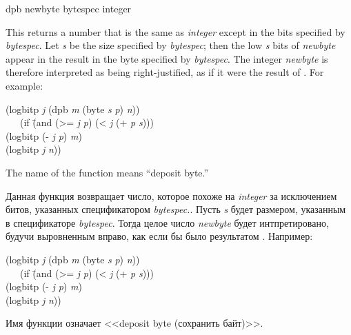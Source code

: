 \begin{defun}[Function]
dpb newbyte bytespec integer

This returns a number that is the same as \emph{integer} except in the
bits specified by \emph{bytespec}.  Let \emph{s} be the size specified
by \emph{bytespec}; then the low \emph{s} bits of \emph{newbyte} appear in
the result in the byte specified by \emph{bytespec}.
The integer \emph{newbyte} is therefore interpreted as
being right-justified, as if it were the result of .
For example:
\begin{lisp}
(logbitp \emph{j} (dpb \emph{m} (byte \emph{s} \emph{p}) \emph{n})) \\
~~\EQ\ (if \=(and (>= \emph{j} \emph{p}) (< \emph{j} (+ \emph{p} \emph{s}))) \\
\>(logbitp (- \emph{j} \emph{p}) \emph{m}) \\
\>(logbitp \emph{j} \emph{n}))
\end{lisp}
The name of the function  means ``deposit byte.''

Данная функция возвращает число, которое похоже на \emph{integer} за исключением
 битов, указанных спецификатором \emph{bytespec.}. Пусть \emph{s} будет
 размером, указанным в спецификаторе \emph{bytespec}.
Тогда целое число \emph{newbyte} будет интпретировано, будучи выровненным вправо,
как если бы было результатом .
Например:
\begin{lisp}
(logbitp \emph{j} (dpb \emph{m} (byte \emph{s} \emph{p}) \emph{n})) \\
~~\EQ\ (if \=(and (>= \emph{j} \emph{p}) (< \emph{j} (+ \emph{p} \emph{s}))) \\
\>(logbitp (- \emph{j} \emph{p}) \emph{m}) \\
\>(logbitp \emph{j} \emph{n}))
\end{lisp}
Имя функции  означает <<deposit byte (сохранить байт)>>.
\end{defun}

